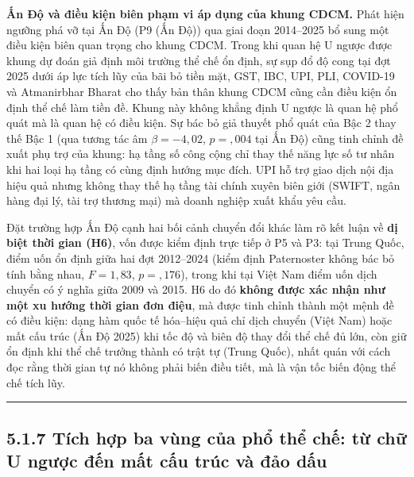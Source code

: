\documentclass[
  a4paper,
  13pt]{extreport}
\begin{document}
\textbf{Ấn Độ và điều kiện biên phạm vi áp dụng của khung CDCM.} Phát
hiện ngưỡng phá vỡ tại Ấn Độ (P9 (Ấn Độ)) qua giai đoạn 2014--2025 bổ
sung một điều kiện biên quan trọng cho khung CDCM. Trong khi quan hệ U
ngược được khung dự đoán giả định môi trường thể chế ổn định, sự sụp đổ
độ cong tại đợt 2025 dưới áp lực tích lũy của bãi bỏ tiền mặt, GST, IBC,
UPI, PLI, COVID-19 và Atmanirbhar Bharat cho thấy bản thân khung CDCM
cũng cần điều kiện ổn định thể chế làm tiền đề. Khung này không khẳng
định U ngược là quan hệ phổ quát mà là quan hệ có điều kiện. Sự bác bỏ
giả thuyết phổ quát của Bậc 2 thay thế Bậc 1 (qua tương tác âm
\(\beta = -4{,}02\), \(p = {,}004\) tại Ấn Độ) cũng tinh chỉnh đề xuất
phụ trợ của khung: hạ tầng số công cộng chỉ thay thế năng lực số tư nhân
khi hai loại hạ tầng có cùng định hướng mục đích. UPI hỗ trợ giao dịch
nội địa hiệu quả nhưng không thay thế hạ tầng tài chính xuyên biên giới
(SWIFT, ngân hàng đại lý, tài trợ thương mại) mà doanh nghiệp xuất khẩu
yêu cầu.

Đặt trường hợp Ấn Độ cạnh hai bối cảnh chuyển đổi khác làm rõ kết luận
về \textbf{dị biệt thời gian (H6)}, vốn được kiểm định trực tiếp ở P5 và
P3: tại Trung Quốc, điểm uốn ổn định giữa hai đợt 2012--2024 (kiểm định
Paternoster không bác bỏ tính bằng nhau, \(F = 1{,}83\),
\(p = {,}176\)), trong khi tại Việt Nam điểm uốn dịch chuyển có ý nghĩa
giữa 2009 và 2015. H6 do đó \textbf{không được xác nhận như một xu hướng
thời gian đơn điệu}, mà được tinh chỉnh thành một mệnh đề có điều kiện:
dạng hàm quốc tế hóa--hiệu quả chỉ dịch chuyển (Việt Nam) hoặc mất cấu
trúc (Ấn Độ 2025) khi tốc độ và biên độ thay đổi thể chế đủ lớn, còn giữ
ổn định khi thể chế trưởng thành có trật tự (Trung Quốc), nhất quán với
cách đọc rằng thời gian tự nó không phải biến điều tiết, mà là vận tốc
biến động thể chế tích lũy.

\begin{center}\rule{0.5\linewidth}{0.5pt}\end{center}

\hypertarget{tuxedch-hux1ee3p-ba-vuxf9ng-cux1ee7a-phux1ed5-thux1ec3-chux1ebf-tux1eeb-chux1eef-u-ngux1b0ux1ee3c-ux111ux1ebfn-mux1ea5t-cux1ea5u-truxfac-vuxe0-ux111ux1ea3o-dux1ea5u}{%
\subsection{5.1.7 Tích hợp ba vùng của phổ thể chế: từ chữ U ngược đến
mất cấu trúc và đảo
dấu}\label{tuxedch-hux1ee3p-ba-vuxf9ng-cux1ee7a-phux1ed5-thux1ec3-chux1ebf-tux1eeb-chux1eef-u-ngux1b0ux1ee3c-ux111ux1ebfn-mux1ea5t-cux1ea5u-truxfac-vuxe0-ux111ux1ea3o-dux1ea5u}}
\end{document}
